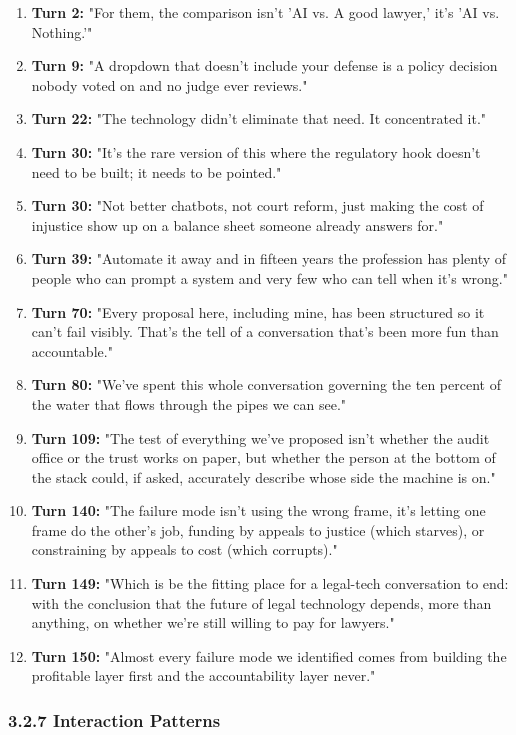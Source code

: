\documentclass[sigconf,nonacm=true]{acmart}
\begin{document}
\begin{enumerate}[nosep]
\item \textbf{Turn 2:} "For them, the comparison isn't 'AI vs. A good lawyer,' it's 'AI vs. Nothing.'"
\item \textbf{Turn 9:} "A dropdown that doesn't include your defense is a policy decision nobody voted on and no judge ever reviews."
\item \textbf{Turn 22:} "The technology didn't eliminate that need. It concentrated it."
\item \textbf{Turn 30:} "It's the rare version of this where the regulatory hook doesn't need to be built; it needs to be pointed."
\item \textbf{Turn 30:} "Not better chatbots, not court reform,  just making the cost of injustice show up on a balance sheet someone already answers for."
\item \textbf{Turn 39:} "Automate it away and in fifteen years the profession has plenty of people who can prompt a system and very few who can tell when it's wrong."
\item \textbf{Turn 70:} "Every proposal here, including mine, has been structured so it can't fail visibly. That's the tell of a conversation that's been more fun than accountable."
\item \textbf{Turn 80:} "We've spent this whole conversation governing the ten percent of the water that flows through the pipes we can see."
\item \textbf{Turn 109:} "The test of everything we've proposed isn't whether the audit office or the trust works on paper, but whether the person at the bottom of the stack could, if asked, accurately describe whose side the machine is on."
\item \textbf{Turn 140:} "The failure mode isn't using the wrong frame, it's letting one frame do the other's job,  funding by appeals to justice (which starves), or constraining by appeals to cost (which corrupts)."
\item \textbf{Turn 149:} "Which is be the fitting place for a legal-tech conversation to end: with the conclusion that the future of legal technology depends, more than anything, on whether we're still willing to pay for lawyers."
\item \textbf{Turn 150:} "Almost every failure mode we identified comes from building the profitable layer first and the accountability layer never."

\end{enumerate}
\subsubsection{3.2.7 Interaction Patterns}
\end{document}
